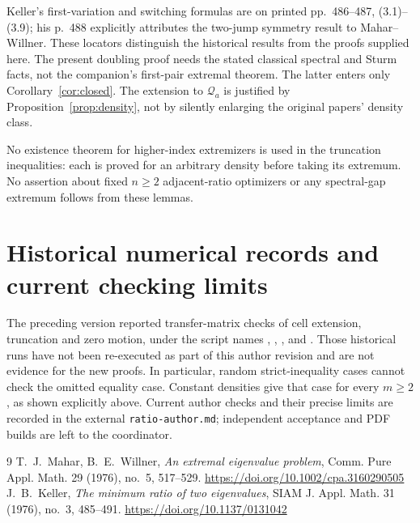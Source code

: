 ﻿\documentclass[11pt]{article}
\begin{document}
Keller's first-variation and switching formulas are on printed
pp.~486--487, (3.1)--(3.9); his p.~488 explicitly attributes the two-jump
symmetry result to Mahar--Willner. These locators distinguish the
historical results from the proofs supplied here. The present doubling
proof needs the stated classical spectral and Sturm facts, not the
companion's first-pair extremal theorem. The latter enters only
Corollary~\ref{cor:closed}. The extension to $\mathcal Q_a$ is justified
by Proposition~\ref{prop:density}, not by silently enlarging the
original papers' density class.

No existence theorem for higher-index extremizers is used in the
truncation inequalities: each is proved for an arbitrary density before
taking its extremum. No assertion about fixed $n\ge2$ adjacent-ratio
optimizers or any spectral-gap extremum follows from these lemmas.

\section{Historical numerical records and current checking limits}

The preceding version reported transfer-matrix checks of cell extension,
truncation and zero motion, under the script names
,
,
, and
. Those historical runs have not been
re-executed as part of this author revision and are not evidence for the
new proofs. In particular, random strict-inequality cases cannot check
the omitted equality case. Constant densities give that case for every
$m\ge2$, as shown explicitly above. Current author checks and their
precise limits are recorded in the external \texttt{ratio-author.md};
independent acceptance and PDF builds are left to the coordinator.

\begin{thebibliography}{9}
 T.~J.~Mahar, B.~E.~Willner, \emph{An extremal eigenvalue
	problem}, Comm. Pure Appl. Math. 29 (1976), no.~5, 517--529.
	\url{https://doi.org/10.1002/cpa.3160290505}
 J.~B.~Keller, \emph{The minimum ratio of two eigenvalues},
	SIAM J. Appl. Math. 31 (1976), no.~3, 485--491.
	\url{https://doi.org/10.1137/0131042}
\end{thebibliography}
\end{document}
